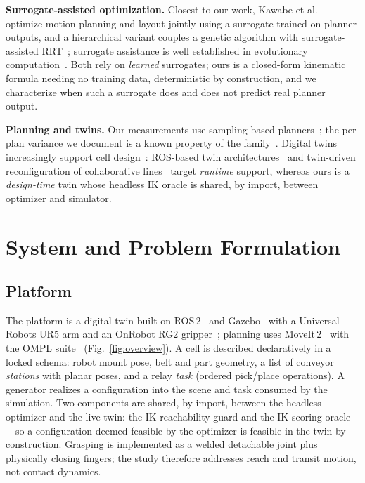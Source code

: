 \documentclass[conference]{IEEEtran}
\begin{document}
\textbf{Surrogate-assisted optimization.} Closest to our work, Kawabe et
al.~\cite{kawabe} optimize motion planning and layout jointly using a surrogate trained on
planner outputs, and a hierarchical variant couples a genetic algorithm with surrogate-assisted
RRT~\cite{kaimujjaman}; surrogate assistance is well established in evolutionary
computation~\cite{surrogatesurvey}. Both rely on \emph{learned} surrogates; ours is a
closed-form kinematic formula needing no training data, deterministic by construction, and we
characterize when such a surrogate does and does not predict real planner output.

\textbf{Planning and twins.} Our measurements use sampling-based
planners~\cite{rrtconnect,rrtstar,prm}; the per-plan variance we document is a known property of
the family~\cite{lavalle}. Digital twins increasingly support cell design~\cite{dtsurvey}:
ROS-based twin architectures~\cite{sueldo} and twin-driven reconfiguration of collaborative
lines~\cite{kousi} target \emph{runtime} support, whereas ours is a \emph{design-time} twin
whose headless IK oracle is shared, by import, between optimizer and simulator.

\section{System and Problem Formulation}
\label{sec:system}

\subsection{Platform}
The platform is a digital twin built on ROS\,2~\cite{ros2} and Gazebo~\cite{gazebo} with a
Universal Robots UR5 arm and an OnRobot RG2 gripper~\cite{hardware}; planning uses
MoveIt\,2~\cite{moveit} with the OMPL suite~\cite{ompl} (Fig.~\ref{fig:overview}). A cell is
described declaratively in a locked schema: robot mount pose, belt and part geometry, a list of
conveyor \emph{stations} with planar poses, and a relay \emph{task} (ordered pick/place
operations). A generator realizes a configuration into the scene and task consumed by the
simulation. Two components are shared, by import, between the headless optimizer and the live
twin: the IK reachability guard and the IK scoring oracle---so a configuration deemed feasible
by the optimizer is feasible in the twin by construction. Grasping is implemented as a welded
detachable joint plus physically closing fingers; the study therefore addresses reach and
transit motion, not contact dynamics.
\end{document}
